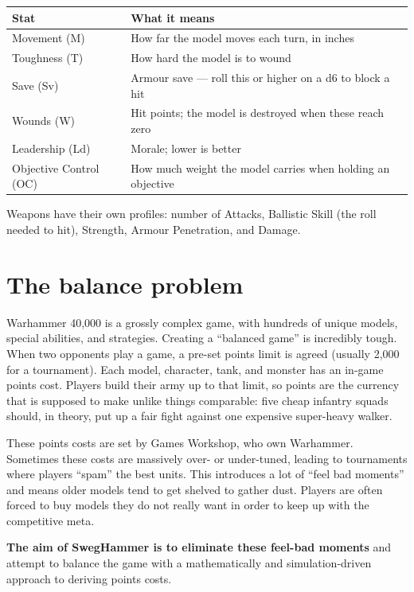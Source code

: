 \documentclass[11pt,a4paper]{article}
\begin{document}
\begin{center}
\begin{tabular}{ll}
  \toprule
  \textbf{Stat} & \textbf{What it means} \\
  \midrule
  Movement (M)         & How far the model moves each turn, in inches \\
  Toughness (T)        & How hard the model is to wound \\
  Save (Sv)            & Armour save --- roll this or higher on a d6 to block a hit \\
  Wounds (W)           & Hit points; the model is destroyed when these reach zero \\
  Leadership (Ld)      & Morale; lower is better \\
  Objective Control (OC) & How much weight the model carries when holding an objective \\
  \bottomrule
\end{tabular}
\end{center}

Weapons have their own profiles: number of Attacks, Ballistic Skill (the
roll needed to hit), Strength, Armour Penetration, and Damage.

\section{The balance problem}

Warhammer 40,000 is a grossly complex game, with hundreds of unique models,
special abilities, and strategies. Creating a ``balanced game'' is incredibly
tough. When two opponents play a game, a pre-set points limit is agreed
(usually 2,000 for a tournament). Each model, character, tank, and monster
has an in-game points cost. Players build their army up to that limit, so
points are the currency that is supposed to make unlike things comparable:
five cheap infantry squads should, in theory, put up a fair fight against
one expensive super-heavy walker.

These points costs are set by Games Workshop, who own Warhammer. Sometimes
these costs are massively over- or under-tuned, leading to tournaments where
players ``spam'' the best units. This introduces a lot of ``feel bad moments''
and means older models tend to get shelved to gather dust. Players are often
forced to buy models they do not really want in order to keep up with the
competitive meta.

\textbf{The aim of SwegHammer is to eliminate these feel-bad moments} and
attempt to balance the game with a mathematically and simulation-driven
approach to deriving points costs.
\end{document}
